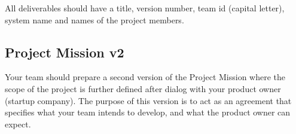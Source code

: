 \documentclass[10pt,a4paper]{article}
\begin{document}
\noindent All deliverables should have a title, version number, team id (capital letter), system name and names of the project members.
%
%
%
%
%

\subsection{Project Mission v2}
Your team should prepare a second version of the Project Mission where the scope of the project is further defined after dialog with your product owner (startup company). The purpose of this version is to act as an agreement that specifies what your team intends to develop, and what the product owner can expect.
\end{document}
